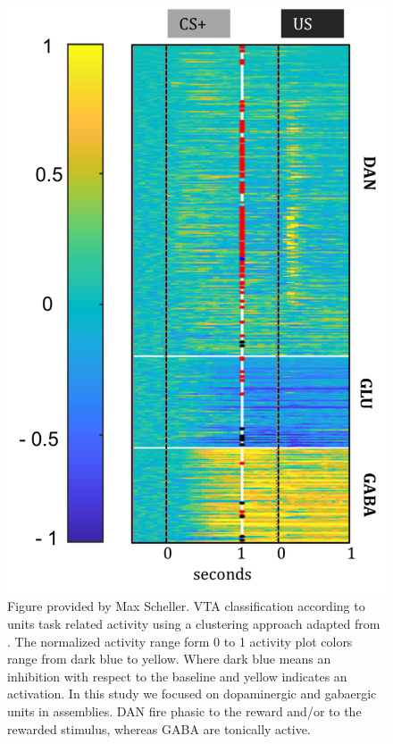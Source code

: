 \begin{figure}[H]
  \centering
    \includegraphics[scale=0.5]{figures/VTA_CellClass.png}
   \caption{Figure provided by Max Scheller. VTA classification according to units task related activity using a clustering approach adapted from \cite{Uchida}. The normalized activity range form 0 to 1 activity plot colors range from dark blue to yellow. Where dark blue means an inhibition with respect to the baseline and yellow indicates an activation. In this study we focused on dopaminergic and gabaergic units in assemblies. DAN fire phasic to the reward and/or to the rewarded stimulus, whereas GABA are tonically active.}
    \label{fig:ClassificatonVTA}
\end{figure}
